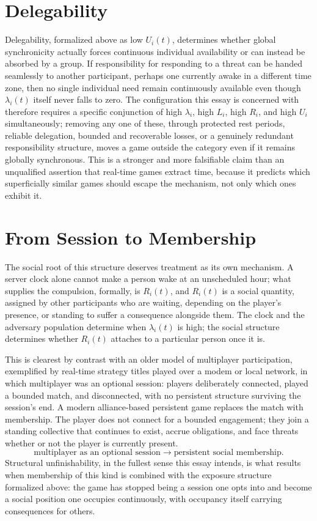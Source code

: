 \documentclass[11pt]{article}
\begin{document}
\section{Delegability}

Delegability, formalized above as low $U_i(t)$, determines whether global synchronicity actually forces continuous individual availability or can instead be absorbed by a group. If responsibility for responding to a threat can be handed seamlessly to another participant, perhaps one currently awake in a different time zone, then no single individual need remain continuously available even though $\lambda_i(t)$ itself never falls to zero. The configuration this essay is concerned with therefore requires a specific conjunction of high $\lambda_i$, high $L_i$, high $R_i$, and high $U_i$ simultaneously; removing any one of these, through protected rest periods, reliable delegation, bounded and recoverable losses, or a genuinely redundant responsibility structure, moves a game outside the category even if it remains globally synchronous. This is a stronger and more falsifiable claim than an unqualified assertion that real-time games extract time, because it predicts which superficially similar games should escape the mechanism, not only which ones exhibit it.

\section{From Session to Membership}

The social root of this structure deserves treatment as its own mechanism. A server clock alone cannot make a person wake at an unscheduled hour; what supplies the compulsion, formally, is $R_i(t)$, and $R_i(t)$ is a social quantity, assigned by other participants who are waiting, depending on the player's presence, or standing to suffer a consequence alongside them. The clock and the adversary population determine when $\lambda_i(t)$ is high; the social structure determines whether $R_i(t)$ attaches to a particular person once it is.

This is clearest by contrast with an older model of multiplayer participation, exemplified by real-time strategy titles played over a modem or local network, in which multiplayer was an optional session: players deliberately connected, played a bounded match, and disconnected, with no persistent structure surviving the session's end. A modern alliance-based persistent game replaces the match with membership. The player does not connect for a bounded engagement; they join a standing collective that continues to exist, accrue obligations, and face threats whether or not the player is currently present.
\[
\boxed{\text{multiplayer as an optional session} \;\longrightarrow\; \text{persistent social membership.}}
\]
Structural unfinishability, in the fullest sense this essay intends, is what results when membership of this kind is combined with the exposure structure formalized above: the game has stopped being a session one opts into and become a social position one occupies continuously, with occupancy itself carrying consequences for others.
\end{document}
